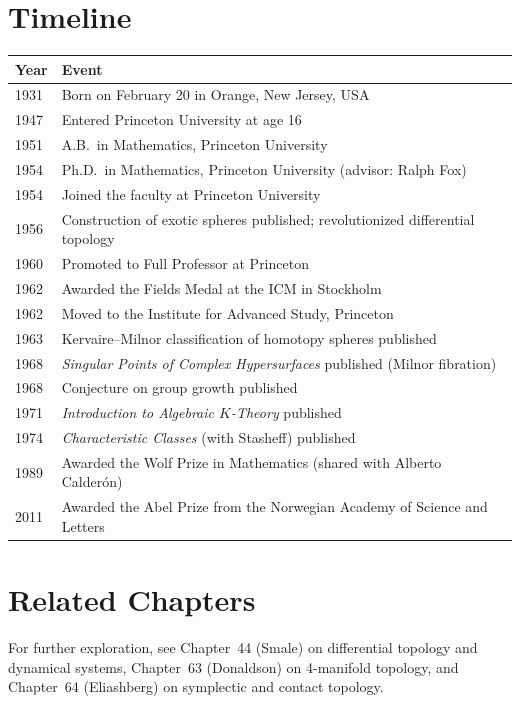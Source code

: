 \section*{Timeline}
\begin{tabularx}{\linewidth}{|p{1.5cm}|>{\raggedright\arraybackslash}X|}
\hline
\textbf{Year} & \textbf{Event} \\ \hline
1931 & Born on February 20 in Orange, New Jersey, USA \\ \hline
1947 & Entered Princeton University at age 16 \\ \hline
1951 & A.B.\ in Mathematics, Princeton University \\ \hline
1954 & Ph.D.\ in Mathematics, Princeton University (advisor: Ralph Fox) \\ \hline
1954 & Joined the faculty at Princeton University \\ \hline
1956 & Construction of exotic spheres published; revolutionized differential topology \\ \hline
1960 & Promoted to Full Professor at Princeton \\ \hline
1962 & Awarded the Fields Medal at the ICM in Stockholm \\ \hline
1962 & Moved to the Institute for Advanced Study, Princeton \\ \hline
1963 & Kervaire--Milnor classification of homotopy spheres published \\ \hline
1968 & \textit{Singular Points of Complex Hypersurfaces} published (Milnor fibration) \\ \hline
1968 & Conjecture on group growth published \\ \hline
1971 & \textit{Introduction to Algebraic \(K\)-Theory} published \\ \hline
1974 & \textit{Characteristic Classes} (with Stasheff) published \\ \hline
1989 & Awarded the Wolf Prize in Mathematics (shared with Alberto Calder\'on) \\ \hline
2011 & Awarded the Abel Prize from the Norwegian Academy of Science and Letters \\ \hline
\end{tabularx}

\section{Related Chapters}
For further exploration, see Chapter~44 (Smale) on differential topology and dynamical systems, Chapter~63 (Donaldson) on 4-manifold topology, and Chapter~64 (Eliashberg) on symplectic and contact topology.

